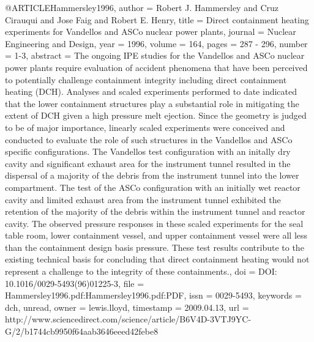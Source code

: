 {@ARTICLE{Hammersley1996,
  author = {Robert J. Hammersley and Cruz Cirauqui and Jose Faig and Robert E.
	Henry},
  title = {Direct containment heating experiments for Vandellos and ASCo nuclear
	power plants},
  journal = {Nuclear Engineering and Design},
  year = {1996},
  volume = {164},
  pages = {287 - 296},
  number = {1-3},
  abstract = {The ongoing IPE studies for the Vandellos and ASCo nuclear power plants
	require evaluation of accident phenomena that have been perceived
	to potentially challenge containment integrity including direct containment
	heating (DCH). Analyses and scaled experiments performed to date
	indicated that the lower containment structures play a substantial
	role in mitigating the extent of DCH given a high pressure melt ejection.
	Since the geometry is judged to be of major importance, linearly
	scaled experiments were conceived and conducted to evaluate the role
	of such structures in the Vandellos and ASCo specific configurations.
	The Vandellos test configuration with an initally dry cavity and
	significant exhaust area for the instrument tunnel resulted in the
	dispersal of a majority of the debris from the instrument tunnel
	into the lower compartment. The test of the ASCo configuration with
	an initially wet reactor cavity and limited exhaust area from the
	instrument tunnel exhibited the retention of the majority of the
	debris within the instrument tunnel and reactor cavity. The observed
	pressure responses in these scaled experiments for the seal table
	room, lower containment vessel, and upper containment vessel were
	all less than the containment design basis pressure. These test results
	contribute to the existing technical basis for concluding that direct
	containment heating would not represent a challenge to the integrity
	of these containments.},
  doi = {DOI: 10.1016/0029-5493(96)01225-3},
  file = {Hammersley1996.pdf:Hammersley1996.pdf:PDF},
  issn = {0029-5493},
  keywords = {dch, unread},
  owner = {lewis.lloyd},
  timestamp = {2009.04.13},
  url = {http://www.sciencedirect.com/science/article/B6V4D-3VTJ9YC-G/2/b1744cb9950f64aab3646eeed42febe8}
}

}
